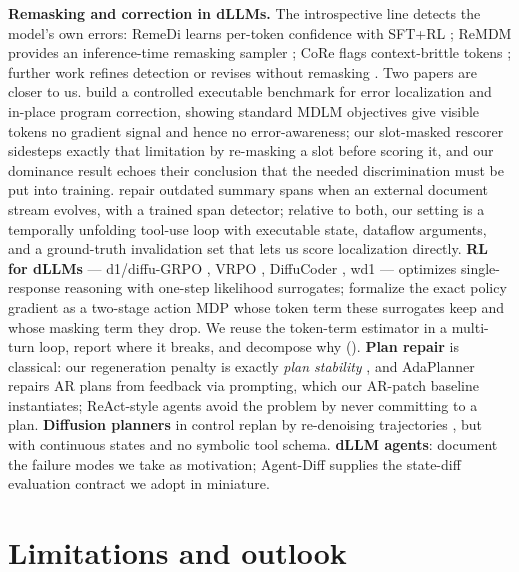 \documentclass{article}
\begin{document}
\textbf{Remasking and correction in dLLMs.} The introspective line detects the model's own
errors: RemeDi learns per-token confidence with SFT+RL \citep{remedi2025}; ReMDM provides an
inference-time remasking sampler \citep{remdm2025}; CoRe flags context-brittle tokens \citep{core2026};
further work refines detection or revises without remasking
\citep{t2m2026,revise2026,selfcorrect2026,hong2025unmask}. Two papers are closer to us.
\citet{cdlm2025} build a controlled executable benchmark for error localization and in-place program
correction, showing standard MDLM objectives give visible tokens no gradient signal and hence no
error-awareness; our slot-masked rescorer sidesteps exactly that limitation by re-masking a slot
before scoring it, and our dominance result echoes their conclusion that the needed discrimination
must be put into training. \citet{zou2026detect} repair outdated summary spans when an external
document stream evolves, with a trained span detector; relative to both, our setting is a
temporally unfolding tool-use loop with executable state, dataflow arguments, and a ground-truth
invalidation set that lets us score localization directly.
\textbf{RL for dLLMs} --- d1/diffu-GRPO \citep{d1_2025}, VRPO \citep{llada15_2025}, DiffuCoder
\citep{diffucoder2025}, wd1 \citep{wd1_2025} --- optimizes single-response reasoning with one-step
likelihood surrogates; \citet{raajesh2026maskaware} formalize the exact policy gradient as a
two-stage action MDP whose token term these surrogates keep and whose masking term they drop. We
reuse the token-term estimator in a multi-turn loop, report where it breaks, and decompose why
().
\textbf{Plan repair} is classical: our regeneration penalty is exactly \emph{plan stability}
\citep{fox2006}, and AdaPlanner \citep{adaplanner2023} repairs AR plans from feedback via prompting,
which our AR-patch baseline instantiates; ReAct-style agents \citep{react2023} avoid the problem by
never committing to a plan. \textbf{Diffusion planners} in control replan by re-denoising trajectories
\citep{diffuser2022,diffusionforcing2024}, but with continuous states and no symbolic tool schema.
\textbf{dLLM agents}: \citet{bitterlesson2026} document the failure modes we take as motivation;
Agent-Diff \citep{agentdiff2026} supplies the state-diff evaluation contract we adopt in miniature.

\section{Limitations and outlook}\label{sec:limits}
\end{document}
